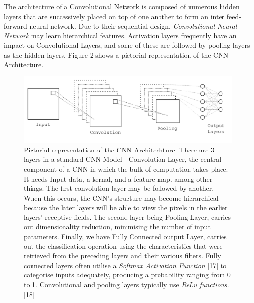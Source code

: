 \documentclass[conference]{IEEEtran}
\begin{document}
The architecture of a Convolutional Network is composed of numerous hidden layers that are successively placed on top of one another to form an inter feed-forward neural network. Due to their sequential design, \textit{Convolutional Neural Network} may learn hierarchical features. Activation layers frequently have an impact on Convolutional Layers, and some of these are followed by pooling layers as the hidden layers. Figure 2 shows a pictorial representation of the CNN Architecture. 
\begin{figure}[htbp]
\label{fig2}
\centerline{\includegraphics[width = \linewidth]{2}}
\caption{Pictorial representation of the CNN Architechture. There are 3 layers in a standard CNN Model - Convolution Layer, the central component of a CNN in which the bulk of computation takes place. It needs Input data, a kernal, and a feature map, among other things. The first convolution layer may be followed by another. When this occurs, the CNN's structure may become hierarchical because the later layers will be able to view the pixels in the earlier layers' receptive fields. The second layer being Pooling Layer, carries out dimensionality reduction, minimising the number of input parameters. Finally, we have Fully Connected output Layer, carries out the classification operation using the characteristics that were retrieved from the preceding layers and their various filters. Fully connected layers often utilise a \textit{Softmax Activation Function} [17] to categorise inputs adequately, producing a probability ranging from 0 to 1. Convolutional and pooling layers typically use \textit{ReLu functions.} [18]}
\end{figure}
\end{document}
